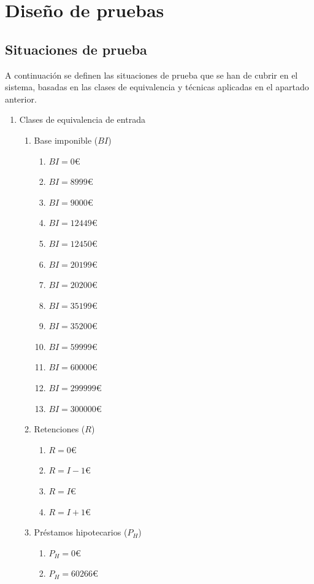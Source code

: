 \chapter{Diseño de pruebas}
\section{Situaciones de prueba}
A continuación se definen las situaciones de prueba que se han de cubrir en el
sistema, basadas en las clases de equivalencia y técnicas aplicadas en el
apartado anterior.

\begin{enumerate}[label=\textbf{SP\arabic*.}]
	\item Clases de equivalencia de entrada
		\begin{enumerate}[label*=\textbf{\arabic*.}]
			\item Base imponible ($BI$)
			\begin{enumerate}[label*=\textbf{\arabic*.}]
				\item $BI = 0$€
				\item $BI = 8999$€
				\item $BI = 9000$€
				\item $BI = 12449$€
				\item $BI = 12450$€
				\item $BI = 20199$€
				\item $BI = 20200$€
				\item $BI = 35199$€
				\item $BI = 35200$€
				\item $BI = 59999$€
				\item $BI = 60000$€
				\item $BI = 299999$€
				\item $BI = 300000$€
			\end{enumerate}
		\item Retenciones ($R$)
			\begin{enumerate}[label*=\textbf{\arabic*.}]
				\item $R = 0$€
				\item $R = I - 1$€
				\item $R = I$€
				\item $R = I + 1$€
			\end{enumerate}
		\item Préstamos hipotecarios ($P_{H}$)
			\begin{enumerate}[label*=\textbf{\arabic*.}]
				\item $P_{H} = 0$€
				\item $P_{H} = 60266$€

\end{enumerate}
\end{enumerate}
\end{enumerate}
